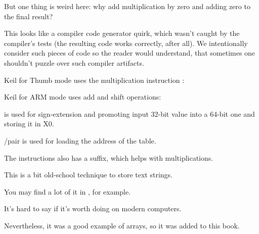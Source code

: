 

\myindex{\CompilerAnomaly}
\label{MSVC2013_anomaly}

But one thing is weird here: why add multiplication by zero and adding zero to the final result?

This looks like a compiler code generator quirk, which wasn't caught by the compiler's tests
(the resulting code works correctly, after all).
%
We intentionally consider such pieces of code so the reader would understand, 
that sometimes one shouldn't puzzle over such compiler artifacts.


\Optimizing Keil 
for Thumb mode uses the multiplication instruction :



\Optimizing Keil for ARM mode uses add and shift operations:







 is used for sign-extension and promoting input 32-bit value into a 64-bit one and storing it in X0.

\ADRP/\ADD pair is used for loading the address of the table.

The \ADD instructions also has a \LSL suffix, which helps with multiplications.



\subsectionold{\Conclusion{}}

This is a bit old-school technique to store text strings.

You may find a lot of it in \oracle, for example.

It's hard to say if it's worth doing on modern computers.

Nevertheless, it was a good example of arrays, so it was added to this book.

